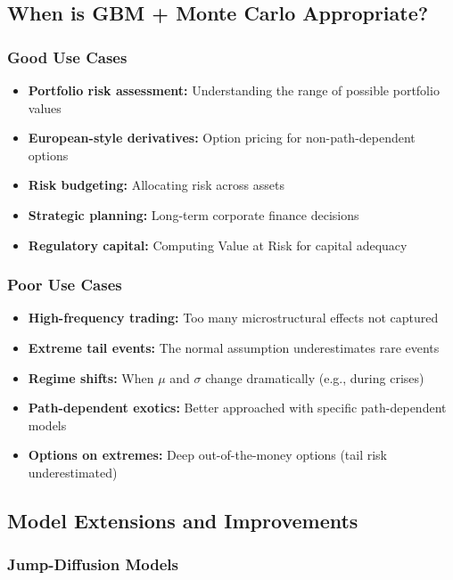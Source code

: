 \documentclass[12pt,a4paper]{article}
\begin{document}
\subsection{When is GBM + Monte Carlo Appropriate?}

\subsubsection{Good Use Cases}

\begin{itemize}
    \item \textbf{Portfolio risk assessment:} Understanding the range of possible portfolio values
    \item \textbf{European-style derivatives:} Option pricing for non-path-dependent options
    \item \textbf{Risk budgeting:} Allocating risk across assets
    \item \textbf{Strategic planning:} Long-term corporate finance decisions
    \item \textbf{Regulatory capital:} Computing Value at Risk for capital adequacy
\end{itemize}

\subsubsection{Poor Use Cases}

\begin{itemize}
    \item \textbf{High-frequency trading:} Too many microstructural effects not captured
    \item \textbf{Extreme tail events:} The normal assumption underestimates rare events
    \item \textbf{Regime shifts:} When $\mu$ and $\sigma$ change dramatically (e.g., during crises)
    \item \textbf{Path-dependent exotics:} Better approached with specific path-dependent models
    \item \textbf{Options on extremes:} Deep out-of-the-money options (tail risk underestimated)
\end{itemize}

\subsection{Model Extensions and Improvements}

\subsubsection{Jump-Diffusion Models}
\end{document}
